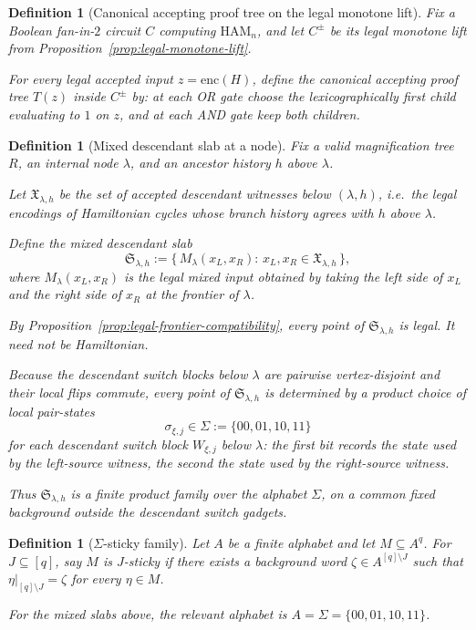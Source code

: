 \documentclass[11pt]{article}
\newtheorem{definition}[theorem]{Definition}
\newcommand{\Ham}{\mathrm{HAM}}
\begin{document}
\begin{definition}[Canonical accepting proof tree on the legal monotone lift]
\label{def:canonical-proof-tree}
Fix a Boolean fan-in-$2$ circuit $C$ computing $\Ham_n$, and let
$C^{\pm}$ be its legal monotone lift from
Proposition~\ref{prop:legal-monotone-lift}.

For every legal accepted input $z=\mathrm{enc}(H)$, define the canonical
accepting proof tree $T(z)$ inside $C^{\pm}$ by: at each OR gate choose
the lexicographically first child evaluating to $1$ on $z$, and at each
AND gate keep both children.
\end{definition}

\begin{definition}[Mixed descendant slab at a node]
\label{def:mixed-descendant-slab}
Fix a valid magnification tree $R$, an internal node $\lambda$, and an
ancestor history $h$ above $\lambda$.

Let $\mathfrak{X}_{\lambda,h}$ be the set of accepted descendant witnesses
below $(\lambda,h)$, i.e.\ the legal encodings of Hamiltonian cycles whose
branch history agrees with $h$ above $\lambda$.

Define the \emph{mixed descendant slab}
\[
\mathfrak{S}_{\lambda,h}
:=\bigl\{\,M_\lambda(x_L,x_R):\,x_L,x_R\in\mathfrak{X}_{\lambda,h}\,\bigr\},
\]
where $M_\lambda(x_L,x_R)$ is the legal mixed input obtained by taking the
left side of $x_L$ and the right side of $x_R$ at the frontier of $\lambda$.

By Proposition~\ref{prop:legal-frontier-compatibility}, every point of
$\mathfrak{S}_{\lambda,h}$ is legal.  It need not be Hamiltonian.

Because the descendant switch blocks below $\lambda$ are pairwise
vertex-disjoint and their local flips commute, every point of
$\mathfrak{S}_{\lambda,h}$ is determined by a product choice of local
pair-states
\[
\sigma_{\xi,j}\in\Sigma:=\{00,01,10,11\}
\]
for each descendant switch block $W_{\xi,j}$ below $\lambda$: the first bit
records the state used by the left-source witness, the second the state used
by the right-source witness.

Thus $\mathfrak{S}_{\lambda,h}$ is a finite product family over the alphabet
$\Sigma$, on a common fixed background outside the descendant switch gadgets.
\end{definition}

\begin{definition}[$\Sigma$-sticky family]
\label{def:sigma-sticky-family}
Let $A$ be a finite alphabet and let $M\subseteq A^q$.  For
$J\subseteq[q]$, say $M$ is \emph{$J$-sticky} if there exists a background
word $\zeta\in A^{[q]\setminus J}$ such that
$\eta|_{[q]\setminus J}=\zeta$ for every $\eta\in M$.

For the mixed slabs above, the relevant alphabet is
$A=\Sigma=\{00,01,10,11\}$.
\end{definition}
\end{document}
